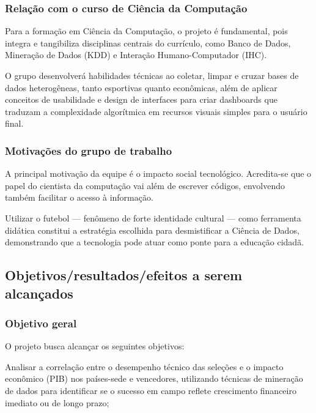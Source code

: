 \documentclass[12pt, a4paper, brazil]{article}
\begin{document}
\subsubsection{Relação com o curso de Ciência da Computação}
Para a formação em Ciência da Computação, o projeto é fundamental, pois integra e tangibiliza disciplinas centrais do currículo, como Banco de Dados, Mineração de Dados (KDD) e Interação Humano-Computador (IHC).

O grupo desenvolverá habilidades técnicas ao coletar, limpar e cruzar bases de dados heterogêneas, tanto esportivas quanto econômicas, além de aplicar conceitos de usabilidade e design de interfaces para criar dashboards que traduzam a complexidade algorítmica em recursos visuais simples para o usuário final.

\subsubsection{Motivações do grupo de trabalho}
A principal motivação da equipe é o impacto social tecnológico. Acredita-se que o papel do cientista da computação vai além de escrever códigos, envolvendo também facilitar o acesso à informação.

Utilizar o futebol — fenômeno de forte identidade cultural — como ferramenta didática constitui a estratégia escolhida para desmistificar a Ciência de Dados, demonstrando que a tecnologia pode atuar como ponte para a educação cidadã.

\subsection{Objetivos/resultados/efeitos a serem alcançados}

\subsubsection{Objetivo geral}
O projeto busca alcançar os seguintes objetivos:

Analisar a correlação entre o desempenho técnico das seleções e o impacto econômico (PIB) nos países-sede e vencedores, utilizando técnicas de mineração de dados para identificar se o sucesso em campo reflete crescimento financeiro imediato ou de longo prazo;
\end{document}
